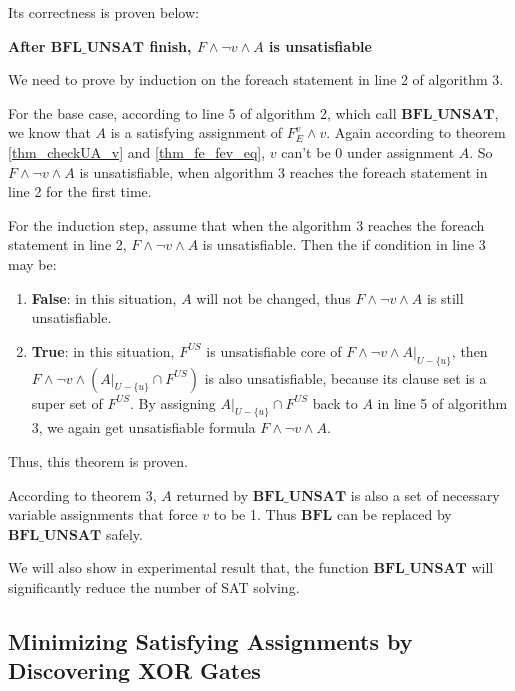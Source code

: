 \documentclass[journal]{IEEEtran}
\begin{document}
Its correctness is proven below:
\vspace{0.2cm}
\begin{theorem}[]\label{thm_BFL_UNSAT}
\textbf{After $\boldsymbol{BFL\_UNSAT}$ finish, $F\wedge\neg v\wedge A$ is unsatisfiable}
\end{theorem}
\begin{IEEEproof}
We need to prove by induction on the foreach statement in line 2 of algorithm 3.

For the base case,
according to line 5 of algorithm 2,
which call $\boldsymbol{BFL\_UNSAT}$,
we know that $A$ is a satisfying assignment of $F_E^v\wedge v$.
Again according to theorem \ref{thm_checkUA_v} and \ref{thm_fe_fev_eq},
$v$ can't be 0 under assignment $A$.
So $F\wedge\neg v\wedge A$ is unsatisfiable,
when algorithm 3 reaches the foreach statement in line 2 for the first time.

For the induction step,
assume that when the algorithm 3 reaches the foreach statement in line 2,
$F\wedge\neg v\wedge A$ is unsatisfiable.
Then the if condition in line 3 may be:
\begin{enumerate}
\item \textbf{False}: in this situation,
$A$ will not be changed,
thus $F\wedge\neg v\wedge A$ is still unsatisfiable.

\item \textbf{True}: in this situation,
$F^{US}$ is unsatisfiable core of $F\wedge\neg v\wedge A|_{U-\{u\}}$,
then $F\wedge\neg v\wedge (A|_{U-\{u\}}\cap F^{US})$ is also unsatisfiable,
because its clause set is a super set of $F^{US}$.
By assigning $A|_{U-\{u\}}\cap F^{US}$ back to $A$ in line 5 of algorithm 3,
we again get unsatisfiable formula $F\wedge\neg v\wedge A$.
\end{enumerate}

Thus, this theorem is proven.
\end{IEEEproof}

According to theorem 3,
$A$ returned by $\boldsymbol{BFL\_UNSAT}$ is also a set of necessary variable assignments that force $v$ to be 1.
Thus $\boldsymbol{BFL}$ can be replaced by $\boldsymbol{BFL\_UNSAT}$ safely.

We will also show in experimental result that,
the function $\boldsymbol{BFL\_UNSAT}$ will significantly reduce the number of SAT solving.

\subsection{Minimizing Satisfying Assignments by Discovering XOR Gates}\label{subsec_XOR}
\end{document}
